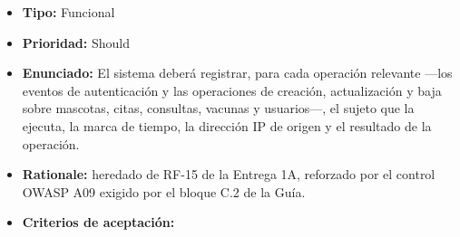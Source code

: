 \documentclass[
  spanish,
]{article}
\providecommand{\tightlist}{%
  \setlength{\itemsep}{0pt}\setlength{\parskip}{0pt}}
\begin{document}
\begin{itemize}
\tightlist
\item
  \textbf{Tipo:} Funcional
\item
  \textbf{Prioridad:} Should
\item
  \textbf{Enunciado:} El sistema deberá registrar, para cada operación
  relevante ---los eventos de autenticación y las operaciones de
  creación, actualización y baja sobre mascotas, citas, consultas,
  vacunas y usuarios---, el sujeto que la ejecuta, la marca de tiempo,
  la dirección IP de origen y el resultado de la operación.
\item
  \textbf{Rationale:} heredado de RF-15 de la Entrega 1A, reforzado por
  el control OWASP A09 exigido por el bloque C.2 de la Guía.
\item
  \textbf{Criterios de aceptación:}


\end{itemize}
\end{document}
